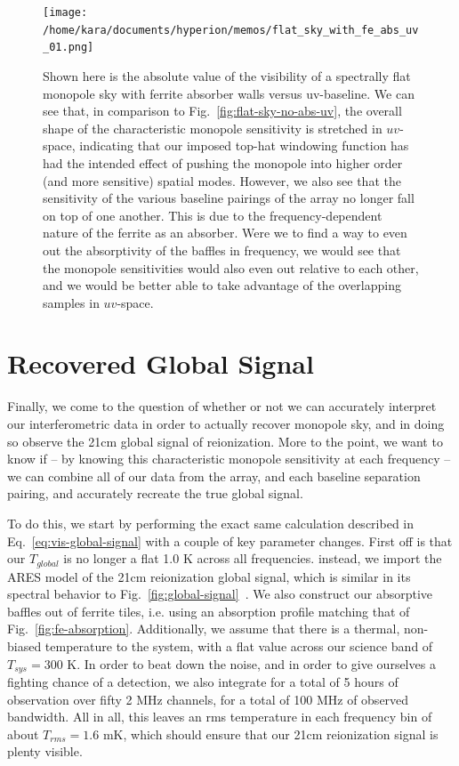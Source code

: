 \begin{figure}
    \begin{center}
    \texttt{[image: /home/kara/documents/hyperion/memos/flat\_sky\_with\_fe\_abs\_uv\_01.png]}
    \end{center}
    \caption{
        Shown here is the absolute value of the visibility of a spectrally flat 
        monopole sky with ferrite absorber walls versus uv-baseline. We can see 
        that, in comparison to Fig.~\ref{fig:flat-sky-no-abs-uv}, the overall 
        shape of the characteristic monopole sensitivity is stretched in 
        $uv$-space, indicating that our imposed top-hat windowing function has 
        had the intended effect of pushing the monopole into higher order (and 
        more sensitive) spatial modes. However, we also see that the 
        sensitivity of the various baseline pairings of the array no longer 
        fall on top of one another. This is due to the frequency-dependent 
        nature of the ferrite as an absorber. Were we to find a way to even out 
        the absorptivity of the baffles in frequency, we would see that the 
        monopole sensitivities would also even out relative to each other, and 
        we would be better able to take advantage of the overlapping samples in 
        $uv$-space.
    }
    \label{fig:flat-sky-fe-abs-uv}
\end{figure}

\section{Recovered Global Signal}
\label{sec:recovered-signal}

Finally, we come to the question of whether or not we can accurately interpret 
our interferometric data in order to actually recover monopole sky, and in 
doing so observe the 21cm global signal of reionization. More to the point, we 
want to know if -- by knowing this characteristic monopole sensitivity at each 
frequency -- we can combine all of our data from the array, and each baseline 
separation pairing, and accurately recreate the true global signal.

To do this, we start by performing the exact same calculation described in 
Eq.~\eqref{eq:vis-global-signal} with a couple of key parameter changes. First 
off is that our $T_{global}$ is no longer a flat 1.0 K across all frequencies.  
instead, we import the ARES model of the 21cm reionization global signal, which 
is similar in its spectral behavior to 
Fig.~\ref{fig:global-signal}~\citep{mirocha2014}. We also construct our 
absorptive baffles out of ferrite tiles, i.e. using an absorption profile 
matching that of Fig.~\ref{fig:fe-absorption}. Additionally, we assume that 
there is a thermal, non-biased temperature to the system, with a flat value 
across our science band of $T_{sys} = 300$ K.  In order to beat down the noise, 
and in order to give ourselves a fighting chance of a detection, we also 
integrate for a total of 5 hours of observation over fifty 2 MHz channels, for 
a total of 100 MHz of observed bandwidth. All in all, this leaves an rms 
temperature in each frequency bin of about $T_{rms} = 1.6$ mK, which should 
ensure that our 21cm reionization signal is plenty visible. 


